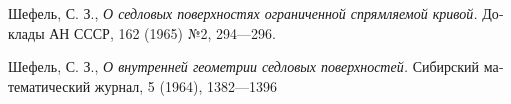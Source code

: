 \documentclass{article}
\begin{document}
\begin{thebibliography}{52}




\begin{otherlanguage}{russian}
Шефель, С. З.,
\textit{О седловых поверхностях ограниченной спрямляемой кривой.}
Доклады АН СССР, 162 (1965) №2, 
294---296.
\end{otherlanguage}

\begin{otherlanguage}{russian}
Шефель, С. З., 
\textit{О внутренней геометрии седловых поверхностей.}
Сибирский математический журнал, 5 (1964), 1382---1396
\end{otherlanguage}





\end{thebibliography}

\Addresses
\end{document}
